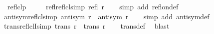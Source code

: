 \begin{isabellebody}
\ \ reflclp\ \ {\isacharparenleft}{\kern0pt}{\isachardoublequoteopen}{\isacharparenleft}{\kern0pt}{\isacharunderscore}{\kern0pt}{\isacharcircum}{\kern0pt}{\isacharequal}{\kern0pt}{\isacharequal}{\kern0pt}{\isacharparenright}{\kern0pt}{\isachardoublequoteclose}\ {\isacharbrackleft}{\kern0pt}{}{}{}{}{\isacharbrackright}{\kern0pt}\ {}{}{}{}{\isacharparenright}{\kern0pt}%
\isadelimdocument
%
\endisadelimdocument
%
\isatagdocument
%
\isamarkuptrue%
%
\endisatagdocument
{\isafolddocument}%
%
\isadelimdocument
%
\endisadelimdocument
{}\isamarkupfalse%
\ refl{\isacharunderscore}{\kern0pt}reflcl{\isacharbrackleft}{\kern0pt}simp{\isacharbrackright}{\kern0pt}{\isacharcolon}{\kern0pt}\ {\isachardoublequoteopen}refl\ {\isacharparenleft}{\kern0pt}r\isactrlsup {\isacharequal}{\kern0pt}{\isacharparenright}{\kern0pt}{\isachardoublequoteclose}\isanewline
%
\isadelimproof
\ \ %
\endisadelimproof
%
\isatagproof
{}\isamarkupfalse%
\ {\isacharparenleft}{\kern0pt}simp\ add{\isacharcolon}{\kern0pt}\ refl{\isacharunderscore}{\kern0pt}on{\isacharunderscore}{\kern0pt}def{\isacharparenright}{\kern0pt}%
\endisatagproof
{\isafoldproof}%
%
\isadelimproof
\isanewline
%
\endisadelimproof
\isanewline
{}\isamarkupfalse%
\ antisym{\isacharunderscore}{\kern0pt}reflcl{\isacharbrackleft}{\kern0pt}simp{\isacharbrackright}{\kern0pt}{\isacharcolon}{\kern0pt}\ {\isachardoublequoteopen}antisym\ {\isacharparenleft}{\kern0pt}r\isactrlsup {\isacharequal}{\kern0pt}{\isacharparenright}{\kern0pt}\ {\isacharequal}{\kern0pt}\ antisym\ r{\isachardoublequoteclose}\isanewline
%
\isadelimproof
\ \ %
\endisadelimproof
%
\isatagproof
{}\isamarkupfalse%
\ {\isacharparenleft}{\kern0pt}simp\ add{\isacharcolon}{\kern0pt}\ antisym{\isacharunderscore}{\kern0pt}def{\isacharparenright}{\kern0pt}%
\endisatagproof
{\isafoldproof}%
%
\isadelimproof
\isanewline
%
\endisadelimproof
\isanewline
{}\isamarkupfalse%
\ trans{\isacharunderscore}{\kern0pt}reflclI{\isacharbrackleft}{\kern0pt}simp{\isacharbrackright}{\kern0pt}{\isacharcolon}{\kern0pt}\ {\isachardoublequoteopen}trans\ r\ {\isasymLongrightarrow}\ trans\ {\isacharparenleft}{\kern0pt}r\isactrlsup {\isacharequal}{\kern0pt}{\isacharparenright}{\kern0pt}{\isachardoublequoteclose}\isanewline
%
\isadelimproof
\ \ %
\endisadelimproof
%
\isatagproof
{}\isamarkupfalse%
\ trans{\isacharunderscore}{\kern0pt}def\ \isamarkupfalse%
\ blast%

\end{isabellebody}
